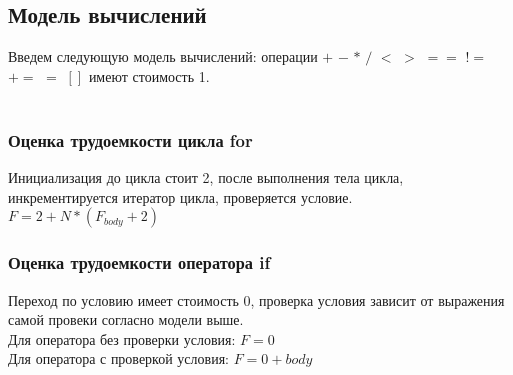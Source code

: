 \documentclass[12pt]{article}
\begin{document}
\subsection{Модель вычислений}
Введем следующую модель вычислений:
операции $+$  $-$  $*$  $/$  $<$  $>$  $==$  $!=$  $+=$  $=$  $[]$  имеют стоимость 1.
\\
\\
\subsubsection{Оценка трудоемкости цикла for}
Инициализация до цикла стоит 2, после выполнения тела цикла, инкрементируется итератор цикла, проверяется условие.
\\
$F = 2 + N*(F_{body} + 2)$

\subsubsection{Оценка трудоемкости оператора if}
Переход по условию имеет стоимость 0, проверка условия зависит от выражения самой провеки согласно модели выше.
\\Для оператора без проверки условия: $F =0$
\\Для оператора с проверкой условия: $F = 0 + body$
\newpage
\end{document}
